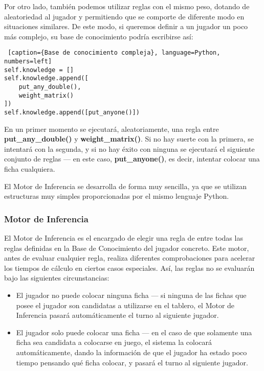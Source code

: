Por otro lado, también podemos utilizar reglas con el mismo peso, dotando de aleatoriedad al jugador y permitiendo
que se comporte de diferente modo en situaciones similares. De este modo, si queremos definir a un jugador un poco
más complejo, su base de conocimiento podría escribirse así:

\begin{lstlisting} [caption={Base de conocimiento compleja}, language=Python, numbers=left]
self.knowledge = []
self.knowledge.append([
    put_any_double(),
    weight_matrix()
])
self.knowledge.append([put_anyone()])
\end{lstlisting}

En un primer momento se ejecutará, aleatoriamente, una regla entre \textbf{put\_any\_double()} y \textbf{weight\_matrix()}.
Si no hay suerte con la primera, se intentará con la segunda, y si no hay éxito con ninguna se ejecutará el siguiente
conjunto de reglas --- en este caso, \textbf{put\_anyone()}, es decir, intentar colocar una ficha cualquiera.

El Motor de Inferencia se desarrolla de forma muy sencilla, ya que se utilizan estructuras muy simples proporcionadas
por el mismo lenguaje Python. \\

\subsubsection{Motor de Inferencia}

El Motor de Inferencia es el encargado de elegir una regla de entre todas las reglas definidas en la Base de Conocimiento
del jugador concreto. Este motor, antes de evaluar cualquier regla, realiza diferentes comprobaciones para acelerar
los tiempos de cálculo en ciertos casos especiales. Así, las reglas no se evaluarán bajo las siguientes circunstancias:
\begin{itemize}
    \item El jugador no puede colocar ninguna ficha --- si ninguna de las fichas que posee el jugador son candidatas
        a utilizarse en el tablero, el Motor de Inferencia pasará automáticamente el turno al siguiente jugador.
    \item El jugador solo puede colocar una ficha ---  en el caso de que solamente una ficha sea candidata a colocarse
        en juego, el sistema la colocará automáticamente, dando la información de que el jugador ha estado poco tiempo
        pensando qué ficha colocar, y pasará el turno al siguiente jugador.
\end{itemize}

